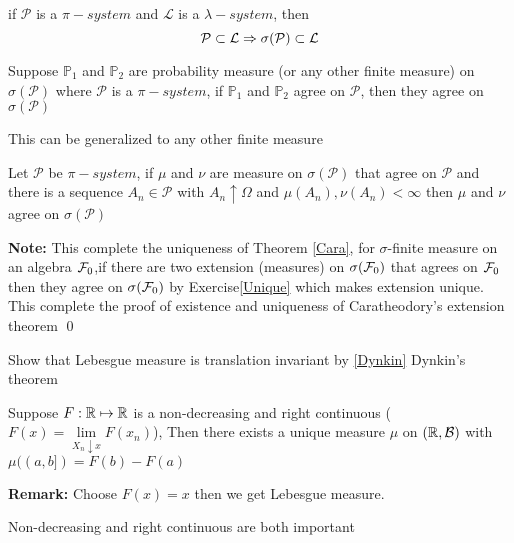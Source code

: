 \newpage
\begin{thm}\label{Dynkin} if $\mathcal{P}$ is a $\pi-system$ and $\mathcal{L}$ is a $\lambda-system$, then 
\begin{equation*}
    \mathcal{P} \subset \mathcal{L} \Rightarrow \sigma(\mathcal{P}) \subset \mathcal{L}
\end{equation*}
\end{thm}
\pf
\newpage
\begin{thm}
Suppose $\mathbb{P}_1$ and $\mathbb{P}_2$ are probability measure (or any other finite measure) on $\sigma(\mathcal{P})$ where $\mathcal{P}$ is a $\pi-system$, if $\mathbb{P}_1$ and $\mathbb{P}_2$ agree on $\mathcal{P}$, then they agree on $\sigma(\mathcal{P})$
\end{thm}
\pf
\vspace{10cm}
This can be generalized to any other finite measure
\begin{ex}\label{Unique}
Let $\mathcal{P}$ be $\pi-system$, if $\mu$ and $\nu$ are measure on $\sigma(\mathcal{P})$ that agree on $\mathcal{P}$ and there is a sequence $A_n \in \mathcal{P}$ with $A_n\uparrow \Omega$ and $\mu(A_n), \nu(A_n) <\infty $ then $\mu$ and $\nu$ agree on $\sigma(\mathcal{P})$
\end{ex}
\vfill
\textbf{Note: }This complete the uniqueness of Theorem \ref{Cara}, for $\sigma$-finite measure on an algebra $\mathcal{F}_0$,if there are two extension (measures) on $\sigma(\mathcal{F}_0)$ that agrees on $\mathcal{F}_0$ then they agree on $\sigma(\mathcal{F}_0)$ by Exercise\ref{Unique} which makes extension unique. This complete the proof of existence and uniqueness of Caratheodory's extension theorem \qed
\newpage
\begin{ex}
Show that Lebesgue measure is translation invariant by \ref{Dynkin} Dynkin's theorem
\end{ex}
\vspace{10cm}
\begin{thm}Suppose $F: \mathbb{R} \mapsto \mathbb{R}$ is a non-decreasing and right continuous ($F(x) = \lim\limits_{X_n\downarrow x}F(x_n)$), Then there exists a unique measure $\mu$ on $(\mathbb{R}, \mathcal{B})$ with $\mu((a,b]) = F(b) - F(a)$ 
\end{thm}
\textbf{Remark: } Choose $F(x) = x$ then we get Lebesgue measure.
\begin{example}
Non-decreasing and right continuous are both important
\end{example}
\newpage
